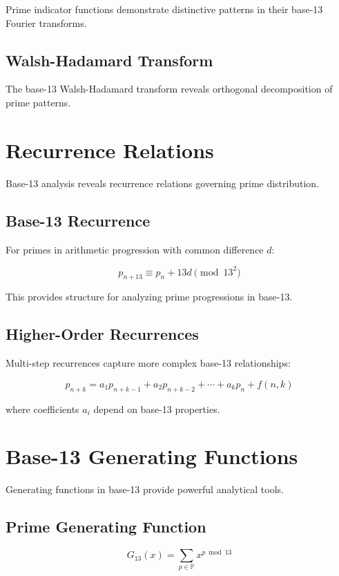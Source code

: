 \documentclass[12pt,a4paper]{report}
\newcommand{\primeSet}{\mathbb{P}}
\begin{document}
Prime indicator functions demonstrate distinctive patterns in their base-13 Fourier transforms.

\subsection{Walsh-Hadamard Transform}

The base-13 Walsh-Hadamard transform reveals orthogonal decomposition of prime patterns.

\section{Recurrence Relations}

Base-13 analysis reveals recurrence relations governing prime distribution.

\subsection{Base-13 Recurrence}

For primes in arithmetic progression with common difference $d$:

\[
p_{n+13} \equiv p_n + 13d \pmod{13^2}
\]

This provides structure for analyzing prime progressions in base-13.

\subsection{Higher-Order Recurrences}

Multi-step recurrences capture more complex base-13 relationships:

\[
p_{n+k} = a_1 p_{n+k-1} + a_2 p_{n+k-2} + \cdots + a_k p_n + f(n, k)
\]

where coefficients $a_i$ depend on base-13 properties.

\section{Base-13 Generating Functions}

Generating functions in base-13 provide powerful analytical tools.

\subsection{Prime Generating Function}

\[
G_{13}(x) = \sum_{p \in \primeSet} x^{p \bmod 13}
\]
\end{document}
